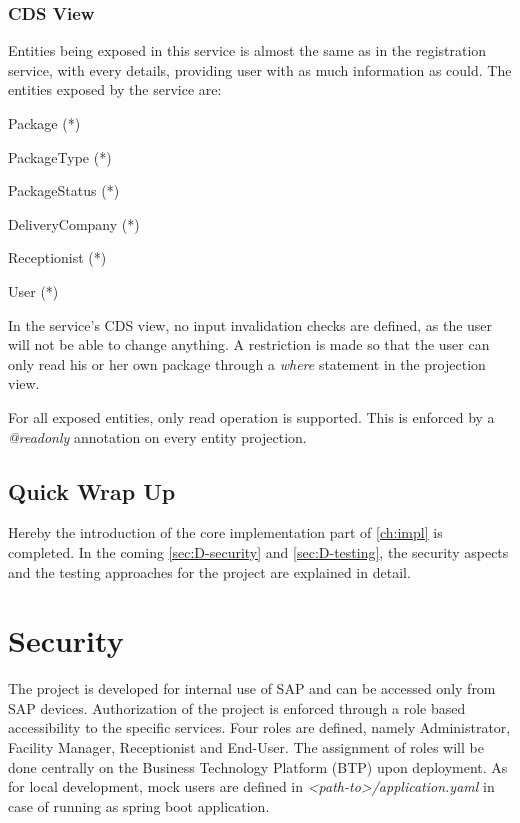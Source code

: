 \subsubsection{CDS View}

Entities being exposed in this service is almost the same as in the registration service, with every details, providing user with as much information as could. The entities exposed by the service are:
\begin{compactenum}
	\item Package (*)
    \item PackageType (*)
    \item PackageStatus (*)
    \item DeliveryCompany (*)
    \item Receptionist (*)
    \item User (*)
\end{compactenum}

\bigskip
In the service's CDS view, no input invalidation checks are defined, as the user will not be able to change anything. A restriction is made so that the user can only read his or her own package through a \textit{where} statement in the projection view.

For all exposed entities, only read operation is supported. This is enforced by a \textit{@readonly} annotation on every entity projection.

\subsection*{Quick Wrap Up}
Hereby the introduction of the core implementation part of \autoref{ch:impl} is completed.
In the coming \autoref{sec:D-security} and \autoref{sec:D-testing}, the security aspects and the testing approaches for the project are explained in detail.

\section{Security}
\label{sec:D-security}

The project is developed for internal use of SAP and can be accessed only from SAP devices. 
Authorization of the project is enforced through a role based accessibility to the specific services. Four roles are defined, namely Administrator, Facility Manager, Receptionist and End-User. The assignment of roles will be done centrally on the Business Technology Platform (BTP) upon deployment. As for local development, mock users are defined in \textit{<path-to>/application.yaml} in case of running as spring boot \cite{springboot-doc} application.

